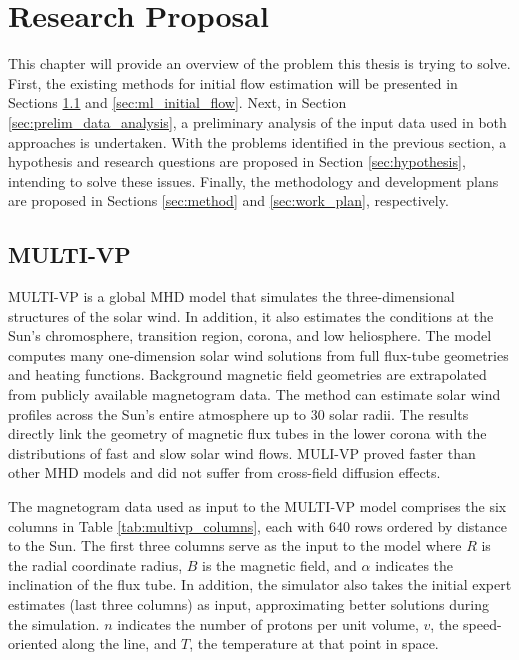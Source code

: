 \chapter{Research Proposal}\label{chap:research_proposal}

This chapter will provide an overview of the problem this thesis is trying to solve. First, the existing methods for initial flow estimation will be presented in Sections \ref{sec:multivp} and \ref{sec:ml_initial_flow}. Next, in Section \ref{sec:prelim_data_analysis}, a preliminary analysis of the input data used in both approaches is undertaken. With the problems identified in the previous section, a hypothesis and research questions are proposed in Section \ref{sec:hypothesis}, intending to solve these issues. Finally, the methodology and development plans are proposed in Sections \ref{sec:method} and \ref{sec:work_plan}, respectively.

\section{MULTI-VP}\label{sec:multivp}

MULTI-VP \cite{pinto.rouillard_MultipleFluxtubeSolar_2017} is a global MHD model that simulates the three-dimensional structures of the solar wind. In addition, it also estimates the conditions at the Sun's chromosphere, transition region, corona, and low heliosphere. The model computes many one-dimension solar wind solutions from full flux-tube geometries and heating functions. Background magnetic field geometries are extrapolated from publicly available magnetogram data. The method can estimate solar wind profiles across the Sun's entire atmosphere up to 30 solar radii. The results directly link the geometry of magnetic flux tubes in the lower corona with the distributions of fast and slow solar wind flows. MULI-VP proved faster than other MHD models and did not suffer from cross-field diffusion effects.

The magnetogram data used as input to the MULTI-VP model comprises the six columns in Table \ref{tab:multivp_columns}, each with 640 rows ordered by distance to the Sun. The first three columns serve as the input to the model where $R$ is the radial coordinate radius, $B$ is the magnetic field, and $\alpha$ indicates the inclination of the flux tube. In addition, the simulator also takes the initial expert estimates (last three columns) as input, approximating better solutions during the simulation. $n$ indicates the number of protons per unit volume, $v$, the speed-oriented along the line, and $T$, the temperature at that point in space. 



